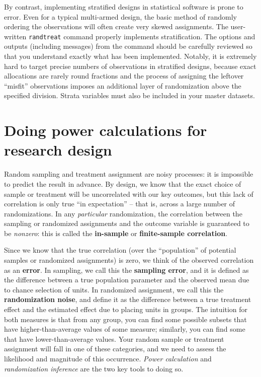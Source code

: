 By contrast, implementing stratified designs in statistical software is prone to error.
Even for a typical multi-armed design, the basic method of randomly ordering the observations
will often create very skewed assignments.
The user-written \texttt{randtreat} command properly implements stratification.\cite{carril2017dealing}
The options and outputs (including messages) from the command should be carefully reviewed
so that you understand exactly what has been implemented.
Notably, it is extremely hard to target precise numbers of observations
in stratified designs, because exact allocations are rarely round fractions
and the process of assigning the leftover ``misfit'' observations
imposes an additional layer of randomization above the specified division.
Strata variables must also be included in your master datasets.


\section{Doing power calculations for research design}

Random sampling and treatment assignment are noisy processes:
it is impossible to predict the result in advance.
By design, we know that the exact choice of sample or treatment
will be uncorrelated with our key outcomes,
but this lack of correlation is only true ``in expectation'' --
that is, across a large number of randomizations.
In any \textit{particular} randomization,
the correlation between the sampling or randomized assignments and the outcome variable
is guaranteed to be \textit{nonzero}:
this is called the \textbf{in-sample} or \textbf{finite-sample correlation}.

Since we know that the true correlation
(over the ``population'' of potential samples or randomized assignments)
is zero, we think of the observed correlation as an \textbf{error}.
In sampling, we call this the \textbf{sampling error},
and it is defined as the difference between a true population parameter
and the observed mean due to chance selection of units.
In randomized assignment, we call this the \textbf{randomization noise},
and define it as the difference between a true treatment effect
and the estimated effect due to placing units in groups.
The intuition for both measures is that from any group,
you can find some possible subsets that have higher-than-average values of some measure;
similarly, you can find some that have lower-than-average values.
Your random sample or treatment assignment will fall in one of these categories,
and we need to assess the likelihood and magnitude of this occurrence.
\textit{Power calculation} and \textit{randomization inference} are the two key tools to doing so.

